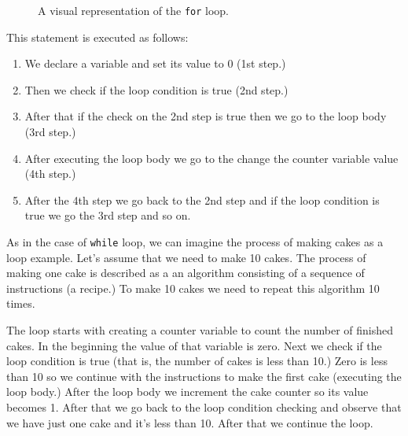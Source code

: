 \documentclass[../sparc.tex]{subfiles}
\begin{document}
\begin{figure}[ht]
  \centering
  \label{fig:control-flow-for-loop}
  \caption{A visual representation of the \texttt{for} loop.}
\end{figure}

This statement is executed as follows:
\begin{enumerate}
\item We declare a variable and set its value to 0 (1st step.)
\item Then we check if the loop condition is true (2nd step.)
\item After that if the check on the 2nd step is true then we go to the loop
  body (3rd step.)
\item After executing the loop body we go to the change the counter variable
  value (4th step.)
\item After the 4th step we go back to the 2nd step and if the loop condition is
  true we go the 3rd step and so on.
\end{enumerate}

As in the case of \texttt{while} loop, we can imagine the process of making
cakes as a loop example.  Let's assume that we need to make 10 cakes.  The
process of making one cake is described as a an algorithm consisting of a
sequence of instructions (a recipe.)  To make 10 cakes we need to repeat this
algorithm 10 times.

The loop starts with creating a counter variable to count the number of finished
cakes.  In the beginning the value of that variable is zero.  Next we check if
the loop condition is true (that is, the number of cakes is less than 10.)  Zero
is less than 10 so we continue with the instructions to make the first cake
(executing the loop body.)  After the loop body we increment the cake counter so
its value becomes 1.  After that we go back to the loop condition checking and
observe that we have just one cake and it's less than 10.  After that we
continue the loop.
\end{document}
